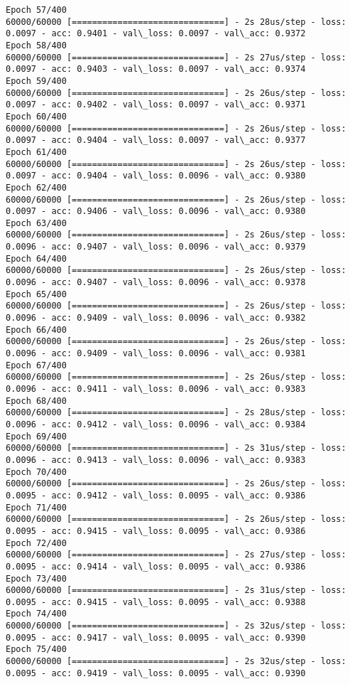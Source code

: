 \documentclass[11pt]{article}
\begin{document}
\begin{Verbatim}[commandchars=\\\{\}]
Epoch 57/400
60000/60000 [==============================] - 2s 28us/step - loss: 0.0097 - acc: 0.9401 - val\_loss: 0.0097 - val\_acc: 0.9372
Epoch 58/400
60000/60000 [==============================] - 2s 27us/step - loss: 0.0097 - acc: 0.9403 - val\_loss: 0.0097 - val\_acc: 0.9374
Epoch 59/400
60000/60000 [==============================] - 2s 26us/step - loss: 0.0097 - acc: 0.9402 - val\_loss: 0.0097 - val\_acc: 0.9371
Epoch 60/400
60000/60000 [==============================] - 2s 26us/step - loss: 0.0097 - acc: 0.9404 - val\_loss: 0.0097 - val\_acc: 0.9377
Epoch 61/400
60000/60000 [==============================] - 2s 26us/step - loss: 0.0097 - acc: 0.9404 - val\_loss: 0.0096 - val\_acc: 0.9380
Epoch 62/400
60000/60000 [==============================] - 2s 26us/step - loss: 0.0097 - acc: 0.9406 - val\_loss: 0.0096 - val\_acc: 0.9380
Epoch 63/400
60000/60000 [==============================] - 2s 26us/step - loss: 0.0096 - acc: 0.9407 - val\_loss: 0.0096 - val\_acc: 0.9379
Epoch 64/400
60000/60000 [==============================] - 2s 26us/step - loss: 0.0096 - acc: 0.9407 - val\_loss: 0.0096 - val\_acc: 0.9378
Epoch 65/400
60000/60000 [==============================] - 2s 26us/step - loss: 0.0096 - acc: 0.9409 - val\_loss: 0.0096 - val\_acc: 0.9382
Epoch 66/400
60000/60000 [==============================] - 2s 26us/step - loss: 0.0096 - acc: 0.9409 - val\_loss: 0.0096 - val\_acc: 0.9381
Epoch 67/400
60000/60000 [==============================] - 2s 26us/step - loss: 0.0096 - acc: 0.9411 - val\_loss: 0.0096 - val\_acc: 0.9383
Epoch 68/400
60000/60000 [==============================] - 2s 28us/step - loss: 0.0096 - acc: 0.9412 - val\_loss: 0.0096 - val\_acc: 0.9384
Epoch 69/400
60000/60000 [==============================] - 2s 31us/step - loss: 0.0096 - acc: 0.9413 - val\_loss: 0.0096 - val\_acc: 0.9383
Epoch 70/400
60000/60000 [==============================] - 2s 26us/step - loss: 0.0095 - acc: 0.9412 - val\_loss: 0.0095 - val\_acc: 0.9386
Epoch 71/400
60000/60000 [==============================] - 2s 26us/step - loss: 0.0095 - acc: 0.9415 - val\_loss: 0.0095 - val\_acc: 0.9386
Epoch 72/400
60000/60000 [==============================] - 2s 27us/step - loss: 0.0095 - acc: 0.9414 - val\_loss: 0.0095 - val\_acc: 0.9386
Epoch 73/400
60000/60000 [==============================] - 2s 31us/step - loss: 0.0095 - acc: 0.9415 - val\_loss: 0.0095 - val\_acc: 0.9388
Epoch 74/400
60000/60000 [==============================] - 2s 32us/step - loss: 0.0095 - acc: 0.9417 - val\_loss: 0.0095 - val\_acc: 0.9390
Epoch 75/400
60000/60000 [==============================] - 2s 32us/step - loss: 0.0095 - acc: 0.9419 - val\_loss: 0.0095 - val\_acc: 0.9390

\end{Verbatim}
\end{document}
